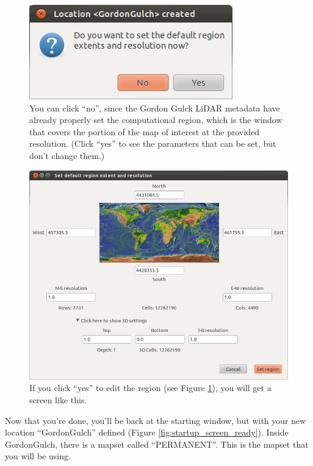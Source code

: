 \documentclass{book}
\begin{document}
\begin{figure}[h]
 \begin{center}
 \includegraphics[width=.5\linewidth]{figures/ubuntu/set_window_popup.png}
 \caption{You can click ``no'', since the Gordon Gulck LiDAR metadata have already properly set the computational region, which is the window that covers the portion of the map of interest at the provided resolution. (Click ``yes'' to see the parameters that can be set, but don't change them.)}
 \label{fig:set_window_popup}
 \end{center}
\end{figure}

\begin{figure}[h]
 \begin{center}
 \includegraphics[width=.9\linewidth]{figures/ubuntu/setregion_startup.png}
 \caption{If you click ``yes'' to edit the region (see Figure \ref{fig:set_window_popup}), you will get a screen like this.}
 \label{fig:setregion_startup}
 \end{center}
\end{figure}

Now that you're done, you'll be back at the starting window, but with your new location ``GordonGulch'' defined (Figure \ref{fig:startup_screen_ready}). Inside GordonGulch, there is a mapset called ``PERMANENT''. This is the mapset that you will be using.
\end{document}
